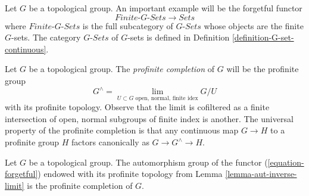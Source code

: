 \begin{example}
\label{example-galois-category-G-sets}
Let $G$ be a topological group. An important example will be the
forgetful functor
\begin{equation}
\label{equation-forgetful}
\textit{Finite-}G\textit{-Sets} \longrightarrow \textit{Sets}
\end{equation}
where $\textit{Finite-}G\textit{-Sets}$ is the full subcategory of
$G\textit{-Sets}$ whose objects are the finite $G$-sets.
The category $G\textit{-Sets}$ of $G$-sets is defined in
Definition \ref{definition-G-set-continuous}.
\end{example}

\noindent
Let $G$ be a topological group. The {\it profinite completion} of $G$
will be the profinite group
$$
G^\wedge =
\lim_{U \subset G\text{ open, normal, finite idex}} G/U
$$
with its profinite topology. Observe that the limit is cofiltered
as a finite intersection of open, normal subgroups of finite index
is another. The universal property of the profinite completion is
that any continuous map $G \to H$ to a profinite group $H$ factors
canonically as $G \to G^\wedge \to H$.

\begin{lemma}
\label{lemma-single-out-profinite}
Let $G$ be a topological group. The automorphism group of the functor
(\ref{equation-forgetful}) endowed with its profinite topology from
Lemma \ref{lemma-aut-inverse-limit} is the profinite completion of $G$.
\end{lemma}

